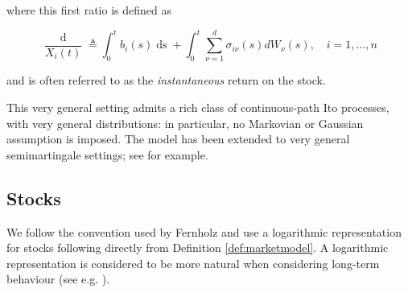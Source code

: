 \documentclass[british]{amsart}
\numberwithin{equation}{section}
\numberwithin{figure}{section}
\theoremstyle{plain}
\theoremstyle{definition}
\theoremstyle{plain}
\theoremstyle{plain}
\theoremstyle{plain}
\theoremstyle{remark}
\theoremstyle{plain}
\renewcommand{\d}[1]{\mathop{\mathrm{d}{#1}}}
\newcommand{\defeq}{\mathop{\triangleq}}
\newcommand{\rangei}{i=1,\dots,n}
\begin{document}
where this first ratio is defined as

\begin{equation*}
	\label{eq:stockpriceprocessdiff}
		\frac{\d{X_{i}(t)}}{X_{i}(t)} \defeq 
				\int_{0}^{t} b_{i}(s)\d{s} + 
				\int_{0}^{t} \sum_{\nu=1}^{d} \sigma_{i\nu}(s) dW_{\nu}(s),
			\quad \rangei
\end{equation*}

and is often referred to as the \textit{instantaneous} return on the stock.

This very general setting admits a rich class of continuous-path Ito processes, with very general distributions: in particular, no Markovian or Gaussian assumption is imposed. The model has been extended to very general semimartingale settings; see \cite{kardaras2003} for example.

\newpage

\subsection{Stocks}

We follow the convention used by Fernholz and use a logarithmic representation for stocks following directly from Definition \ref{def:marketmodel}. A logarithmic representation is considered to be more natural when considering long-term behaviour (see e.g. \cite{fernholz1982}).
\end{document}
